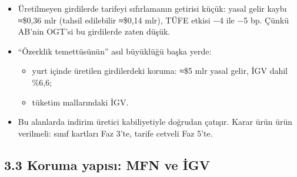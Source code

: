 \begin{itemize}
\tightlist
\item
  Üretilmeyen girdilerde tarifeyi sıfırlamanın getirisi küçük: yasal gelir kaybı ≈\$0,36 mlr (tahsil edilebilir ≈\$0,14 mlr), TÜFE etkisi −4 ile −5 bp. Çünkü AB'nin OGT'si bu girdilerde zaten düşük.
\item
  ``Özerklik temettüsünün'' asıl büyüklüğü başka yerde:

  \begin{itemize}
  \tightlist
  \item
    yurt içinde üretilen girdilerdeki koruma: ≈\$5 mlr yasal gelir, İGV dahil \%6,6;
  \item
    tüketim mallarındaki İGV.
  \end{itemize}
\item
  Bu alanlarda indirim üretici kabiliyetiyle doğrudan çatışır. Karar ürün ürün verilmeli: sınıf kartları Faz 3'te, tarife cetveli Faz 5'te.
\end{itemize}

\hypertarget{02a_politika_uzayi-33-koruma-yapux131sux131-mfn-ve-iux307gv}{%
\subsection{3.3 Koruma yapısı: MFN ve İGV}\label{02a_politika_uzayi-33-koruma-yapux131sux131-mfn-ve-iux307gv}}

\begingroup\gbtablo\footnotesize

